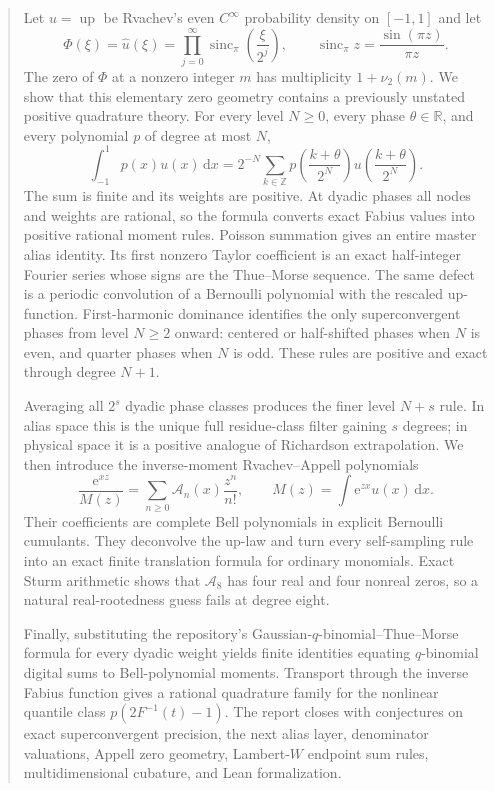 \documentclass[11pt]{article}
\numberwithin{equation}{section}
\theoremstyle{definition}
\theoremstyle{remark}
\newcommand{\R}{\mathbb R}
\newcommand{\Z}{\mathbb Z}
\newcommand{\Up}{\operatorname{up}}
\newcommand{\sincpi}{\operatorname{sinc}_{\pi}}
\newcommand{\dd}{\,\mathrm d}
\newcommand{\e}{\mathrm e}
\newcommand{\Acal}{\mathscr A}
\begin{document}
\clearpage
\hypersetup{pageanchor=true}

\begin{abstract}
Let $u=\Up$ be Rvachev's even $C^\infty$ probability density on $[-1,1]$ and let
\[
 \Phi(\xi)=\widehat u(\xi)
 =\prod_{j=0}^{\infty}\sincpi\!\left(\frac{\xi}{2^j}\right),
 \qquad \sincpi z=\frac{\sin(\pi z)}{\pi z}.
\]
The zero of $\Phi$ at a nonzero integer $m$ has multiplicity $1+\nu_2(m)$.  We show that this elementary zero geometry contains a previously unstated positive quadrature theory.  For every level $N\ge0$, every phase $\theta\in\R$, and every polynomial $p$ of degree at most $N$,
\[
 \int_{-1}^{1}p(x)u(x)\dd x
 =2^{-N}\sum_{k\in\Z}
 p\!\left(\frac{k+\theta}{2^N}\right)
 u\!\left(\frac{k+\theta}{2^N}\right).
\]
The sum is finite and its weights are positive.  At dyadic phases all nodes and weights are rational, so the formula converts exact Fabius values into positive rational moment rules.  Poisson summation gives an entire master alias identity.  Its first nonzero Taylor coefficient is an exact half-integer Fourier series whose signs are the Thue--Morse sequence.  The same defect is a periodic convolution of a Bernoulli polynomial with the rescaled up-function.  First-harmonic dominance identifies the only superconvergent phases from level $N\ge2$ onward: centered or half-shifted phases when $N$ is even, and quarter phases when $N$ is odd.  These rules are positive and exact through degree $N+1$.

Averaging all $2^s$ dyadic phase classes produces the finer level $N+s$ rule.  In alias space this is the unique full residue-class filter gaining $s$ degrees; in physical space it is a positive analogue of Richardson extrapolation.  We then introduce the inverse-moment Rvachev--Appell polynomials
\[
 \frac{\e^{xz}}{M(z)}=\sum_{n\ge0}\Acal_n(x)\frac{z^n}{n!},
 \qquad
 M(z)=\int\e^{zx}u(x)\dd x.
\]
Their coefficients are complete Bell polynomials in explicit Bernoulli cumulants.  They deconvolve the up-law and turn every self-sampling rule into an exact finite translation formula for ordinary monomials.  Exact Sturm arithmetic shows that $\Acal_8$ has four real and four nonreal zeros, so a natural real-rootedness guess fails at degree eight.

Finally, substituting the repository's Gaussian-$q$-binomial--Thue--Morse formula for every dyadic weight yields finite identities equating $q$-binomial digital sums to Bell-polynomial moments.  Transport through the inverse Fabius function gives a rational quadrature family for the nonlinear quantile class $p(2F^{-1}(t)-1)$.  The report closes with conjectures on exact superconvergent precision, the next alias layer, denominator valuations, Appell zero geometry, Lambert-$W$ endpoint sum rules, multidimensional cubature, and Lean formalization.
\end{abstract}
\end{document}
